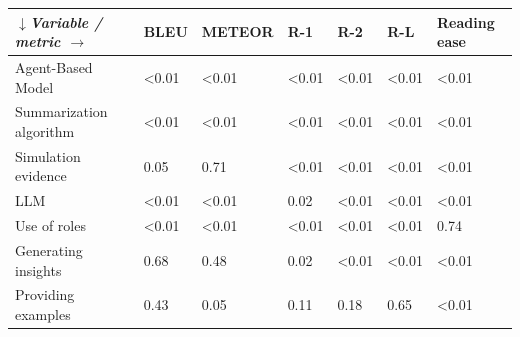 \begin{tabular}{|l|l|l|l|l|l|l|}
\hline
\textit{$\downarrow$Variable / metric $\rightarrow$} & BLEU & METEOR & R-1 & R-2 & R-L & Reading ease \\
 \hline
 Agent-Based Model & \textless{}0.01 & \textless{}0.01 & \textless{}0.01 & \textless{}0.01 & \textless{}0.01 & \textless{}0.01 \\
 \hline
 Summarization algorithm & \textless{}0.01 & \textless{}0.01 & \textless{}0.01 & \textless{}0.01 & \textless{}0.01 & \textless{}0.01 \\
 \hline
 Simulation evidence & 0.05 & 0.71 & \textless{}0.01 & \textless{}0.01 & \textless{}0.01 & \textless{}0.01 \\
 \hline
 LLM & \textless{}0.01 & \textless{}0.01 & 0.02 & \textless{}0.01 & \textless{}0.01 & \textless{}0.01 \\
 \hline
 Use of roles & \textless{}0.01 & \textless{}0.01 & \textless{}0.01 & \textless{}0.01 & \textless{}0.01 & 0.74 \\
 \hline
 Generating insights & 0.68 & 0.48 & 0.02 & \textless{}0.01 & \textless{}0.01 & \textless{}0.01 \\
 \hline
 Providing examples & 0.43 & 0.05 & 0.11 & 0.18 & 0.65 & \textless{}0.01 \\
\hline
\end{tabular}
